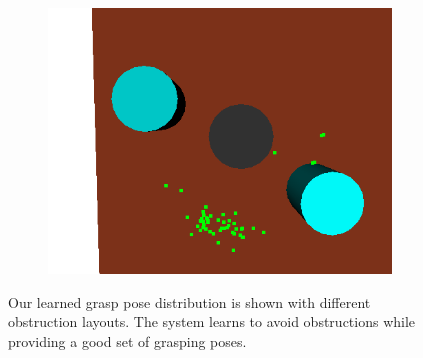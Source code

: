 \begin{figure}
\begin{subfigure}[b]{0.3\linewidth}
    \caption{}
  \end{subfigure}
  \begin{subfigure}[b]{0.3\linewidth}
    \includegraphics[width=\textwidth]{images/finalgraspobstr2.png}
    \caption{}
  \end{subfigure}
  \caption{Our learned grasp pose distribution
is shown with different obstruction layouts. The system learns to
avoid obstructions while providing a good set of grasping poses.}
  \label{fig:obstr}
\end{figure}

